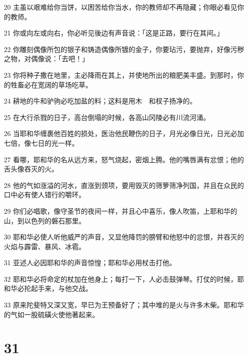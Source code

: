 \par 20 主虽以艰难给你当饼，以困苦给你当水，你的教师却不再隐藏；你眼必看见你的教师。
\par 21 你或向左或向右，你必听见後边有声音说：「这是正路，要行在其间。」
\par 22 你雕刻偶像所包的银子和铸造偶像所镀的金子，你要玷污，要抛弃，好像污秽之物，对偶像说：「去吧！」
\par 23 你将种子撒在地里，主必降雨在其上，并使地所出的粮肥美丰盛。到那时，你的牲畜必在宽阔的草场吃草。
\par 24 耕地的牛和驴驹必吃加盐的料；这料是用木　和杈子扬净的。
\par 25 在大行杀戮的日子，高台倒塌的时候，各高山冈陵必有川流河涌。
\par 26 当耶和华缠裹他百姓的损处，医治他民鞭伤的日子，月光必像日光，日光必加七倍，像七日的光一样。
\par 27 看哪，耶和华的名从远方来，怒气烧起，密烟上腾。他的嘴唇满有忿恨；他的舌头像吞灭的火。
\par 28 他的气如涨溢的河水，直涨到颈项，要用毁灭的筛箩筛净列国，并且在众民的口中必有使人错行的嚼环。
\par 29 你们必唱歌，像守圣节的夜间一样，并且心中喜乐，像人吹笛，上耶和华的山，到以色列的磐石那里。
\par 30 耶和华必使人听他威严的声音，又显他降罚的膀臂和他怒中的忿恨，并吞灭的火焰与霹雷、暴风、冰雹。
\par 31 亚述人必因耶和华的声音惊惶；耶和华必用杖击打他。
\par 32 耶和华必将命定的杖加在他身上；每打一下，人必击鼓弹琴。打仗的时候，耶和华必抡起手来，与他交战。
\par 33 原来陀斐特又深又宽，早已为王预备好了；其中堆的是火与许多木柴。耶和华的气如一股硫磺火使他著起来。

\chapter{31}

